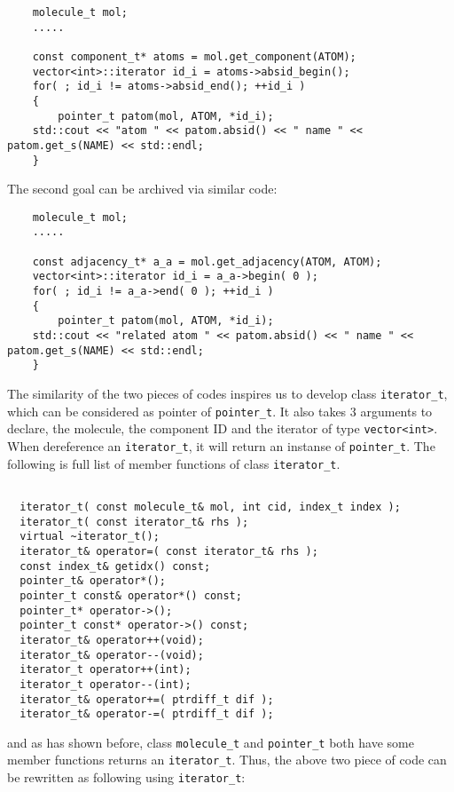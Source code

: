 \documentclass[letterpaper]{book}
\begin{document}
\begin{lstlisting}
    molecule_t mol;
    .....

    const component_t* atoms = mol.get_component(ATOM);
    vector<int>::iterator id_i = atoms->absid_begin();
    for( ; id_i != atoms->absid_end(); ++id_i )
    {
        pointer_t patom(mol, ATOM, *id_i);
	std::cout << "atom " << patom.absid() << " name " << patom.get_s(NAME) << std::endl;
    }

\end{lstlisting}

The second goal can be archived via similar code:

\begin{lstlisting}
    molecule_t mol;
    .....

    const adjacency_t* a_a = mol.get_adjacency(ATOM, ATOM);
    vector<int>::iterator id_i = a_a->begin( 0 );
    for( ; id_i != a_a->end( 0 ); ++id_i )
    {
        pointer_t patom(mol, ATOM, *id_i);
	std::cout << "related atom " << patom.absid() << " name " << patom.get_s(NAME) << std::endl;
    }

\end{lstlisting}

The similarity of the two pieces of codes inspires us to develop class \lstinline$iterator_t$, which
can be considered as pointer of \lstinline$pointer_t$. It also takes 3 arguments to declare, the 
molecule, the component ID and the iterator of type \lstinline$vector<int>$. When dereference an
\lstinline$iterator_t$, it will return an instanse of \lstinline$pointer_t$.  The following is
full list of member functions of class \lstinline$iterator_t$.

\begin{lstlisting}

  iterator_t( const molecule_t& mol, int cid, index_t index );
  iterator_t( const iterator_t& rhs );
  virtual ~iterator_t();
  iterator_t& operator=( const iterator_t& rhs );
  const index_t& getidx() const;
  pointer_t& operator*();
  pointer_t const& operator*() const;
  pointer_t* operator->();
  pointer_t const* operator->() const;
  iterator_t& operator++(void);
  iterator_t& operator--(void);
  iterator_t operator++(int);
  iterator_t operator--(int);
  iterator_t& operator+=( ptrdiff_t dif );
  iterator_t& operator-=( ptrdiff_t dif );

\end{lstlisting}

and as has shown before, class \lstinline$molecule_t$ and \lstinline$pointer_t$ both have some member
functions returns an \lstinline$iterator_t$. Thus, the above two piece of code can be rewritten as
following using \lstinline$iterator_t$:
\end{document}
